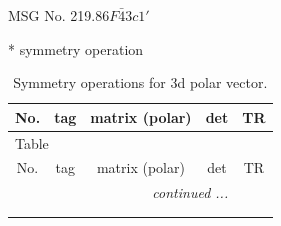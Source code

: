 \documentclass[fleqn,8pt]{jsarticle}
\begin{document}
\setcounter{MaxMatrixCols}{32}

\renewcommand{\tablename}{Table~}
\renewcommand{\figurename}{Figure~}
\begin{center}
\LARGE
MSG No. 219.86\quad$F\bar{4}3c1'$
\end{center}
* symmetry operation
\renewcommand{\arraystretch}{1.3}
\begin{longtable}{ccccc}
\caption{Symmetry operations for 3d polar vector.}
 \\
 \hline \hline
No. & tag & matrix (polar) & det & TR \\ \hline \endfirsthead

\multicolumn{4}{l}{\tablename\ \thetable{}} \\
 \hline \hline
No. & tag & matrix (polar) & det & TR \\ \hline \endhead

 \hline \hline
\multicolumn{4}{r}{\footnotesize\it continued ...} \\ \endfoot

 \hline \hline
\multicolumn{4}{r}{} \\ \endlastfoot


\end{longtable}
\end{document}
